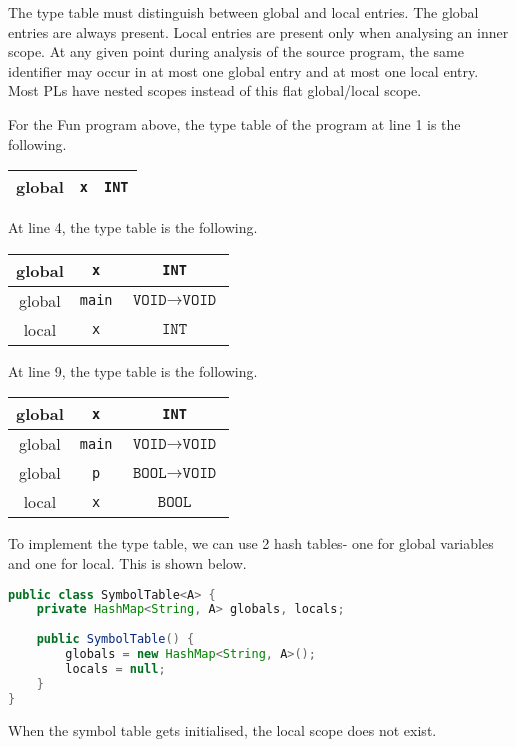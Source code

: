 \documentclass[a4paper, openany]{memoir}
\begin{document}
The type table must distinguish between global and local entries. The global entries are always present. Local entries are present only when analysing an inner scope. At any given point during analysis of the source program, the same identifier may occur in at most one global entry and at most one local entry. Most PLs have nested scopes instead of this flat global/local scope.

For the Fun program above, the type table of the program at line 1 is the following.
\begin{table}[H]
    \centering
    \begin{tabular}{|c|c|c|}
        \hline
        global & \texttt{x} & \texttt{INT} \\
        \hline
    \end{tabular}
\end{table}
\noindent At line 4, the type table is the following.
\begin{table}[H]
    \centering
    \begin{tabular}{|c|c|c|}
        \hline
        global & \texttt{x} & \texttt{INT} \\
        \hline
        global & \texttt{main} & $\texttt{VOID} \to \texttt{VOID}$ \\
        \hline
        local & \texttt{x} & $\texttt{INT}$ \\
        \hline
    \end{tabular}
\end{table}
\noindent At line 9, the type table is the following.
\begin{table}[H]
    \centering
    \begin{tabular}{|c|c|c|}
        \hline
        global & \texttt{x} & \texttt{INT} \\
        \hline
        global & \texttt{main} & $\texttt{VOID} \to \texttt{VOID}$ \\
        \hline
        global & \texttt{p} & $\texttt{BOOL} \to \texttt{VOID}$ \\
        \hline
        local & \texttt{x} & $\texttt{BOOL}$ \\
        \hline
    \end{tabular}
\end{table}

To implement the type table, we can use 2 hash tables- one for global variables and one for local. This is shown below.
\begin{lstlisting}[language=java]
public class SymbolTable<A> {
    private HashMap<String, A> globals, locals;
    
    public SymbolTable() {
        globals = new HashMap<String, A>();
        locals = null;
    }
}
\end{lstlisting}
When the symbol table gets initialised, the local scope does not exist.
\end{document}

